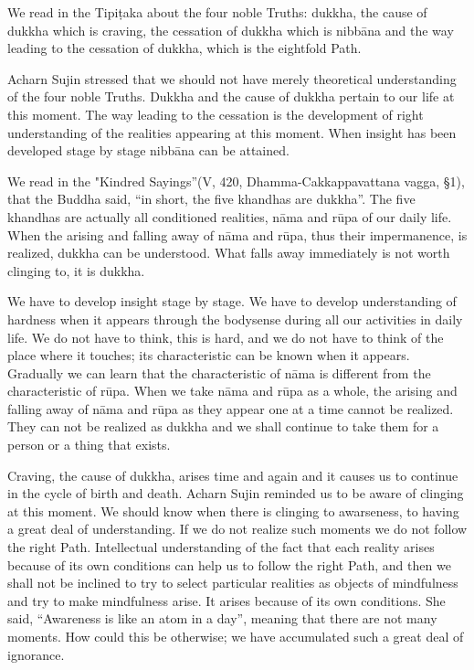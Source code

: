 We read in the Tipiṭaka about the four noble Truths: dukkha, the cause of dukkha which is craving, the cessation of dukkha which is nibbāna and the way leading to the cessation of dukkha, which is the eightfold Path.

Acharn Sujin stressed that we should not have merely theoretical understanding of the four noble Truths. Dukkha and the cause of dukkha pertain to our life at this moment. The way leading to the cessation is the development of right understanding of the realities appearing at this moment. When insight has been developed stage by stage nibbāna can be attained.

We read in the "Kindred Sayings''(V, 420, Dhamma-Cakkappavattana vagga, §1), that the Buddha said, ``in short, the five khandhas are dukkha”. The five khandhas are actually all conditioned realities, nāma and rūpa of our daily life. When the arising and falling away of nāma and rūpa, thus their impermanence, is realized, dukkha can be understood. What falls away immediately is not worth clinging to, it is dukkha.

We have to develop insight stage by stage. We have to develop understanding of hardness when it appears through the bodysense during all our activities in daily life. We do not have to think, this is hard, and we do not have to think of the place where it touches; its characteristic can be known when it appears. Gradually we can learn that the characteristic of nāma is different from the characteristic of rūpa. When we take nāma and rūpa as a whole, the arising and falling away of nāma and rūpa as they appear one at a time cannot be realized. They can not be realized as dukkha and we shall continue to take them for a person or a thing that exists.

Craving, the cause of dukkha, arises time and again and it causes us to continue in the cycle of birth and death. Acharn Sujin reminded us to be aware of clinging at this moment. We should know when there is clinging to awarseness, to having a great deal of understanding. If we do not realize such moments we do not follow the right Path. Intellectual understanding of the fact that each reality arises because of its own conditions can help us to follow the right Path, and then we shall not be inclined to try to select particular realities as objects of mindfulness and try to make mindfulness arise. It arises because of its own conditions. She said, ``Awareness is like an atom in a day'', meaning that there are not many moments. How could this be otherwise; we have accumulated such a great deal of ignorance.

